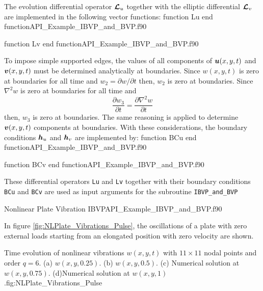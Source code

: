 The evolution differential operator $ \boldsymbol{\mathcal{L}}_u $ together with the elliptic differential $ \boldsymbol{\mathcal{L}}_v $ are implemented in the following vector functions: 
\vspace{0.5cm} 
{function Lu}
{end function}{API_Example_IBVP_and_BVP.f90}
   
\vspace{0.5cm} 
{function Lv}
{end function}{API_Example_IBVP_and_BVP.f90}


To impose simple supported edges, the values of all components of  $ \boldsymbol{u}(x,y,t) $ and 
 $ \boldsymbol{v}(x,y,t) $ must be determined analytically at boundaries. Since $ w(x,y,t) $ is zero at boundaries for all time and $  w_2  = \partial w / \partial t$ then, $ w_2 $ is zero at boundaries. Since $ \nabla^2 w $ is zero at boundaries for all time and 
 $$ 
 \frac{\partial w_3 }{ \partial t }  = \frac{\partial  \nabla^2 w }{  \partial t}
 $$ 
 then, $ w_3 $ is zero at boundaries. The same reasoning is applied to determine
 $ \boldsymbol{v}(x,y,t) $ components at boundaries.%
With these considerations, the boundary conditions $ \boldsymbol{h}_u $ and  $ \boldsymbol{h}_v $ are implemented by:
\vspace{0.5cm} 
{function BCu}
{end function}{API_Example_IBVP_and_BVP.f90}


\vspace{0.5cm} 
{function BCv}
{end function}{API_Example_IBVP_and_BVP.f90}


These differential operators \verb|Lu| and \verb|Lv| together with their boundary conditions \verb|BCu| and \verb|BCv|  are used as input arguments for the subroutine \verb|IBVP_and_BVP|

\vspace{0.5cm} 
{Nonlinear Plate Vibration}
{IBVP}{API_Example_IBVP_and_BVP.f90}


In figure \ref{fig:NLPlate_Vibrations_Pulse}, the oscillations of a plate with zero external loads starting from an elongated position with zero velocity  are shown. 

\fourgraphs
{}
{}
{}
{}
{Time evolution of nonlinear vibrations $w(x,y,t) $ with  $11 \times 11$ nodal points and order $q=6$. (a)  $w(x,y,0.25)$. (b)  $w(x,y,0.5)$. (c) Numerical solution at $w(x,y,0.75)$. (d)Numerical solution at $w(x,y,1)$.}{fig:NLPlate_Vibrations_Pulse}














